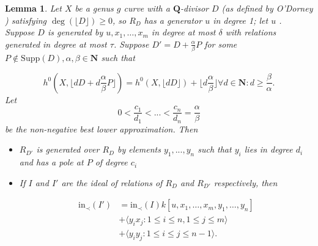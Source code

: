 \documentclass{amsart}
\theoremstyle{plain}
\newtheorem{lem}[thm]{Lemma}
\theoremstyle{definition}
\theoremstyle{remark}
\numberwithin{equation}{section}
\newcommand \Supp{\text{Supp}}
\newcommand \initial{\text{in}}
\begin{document}
\begin{lem}
\label{lem:deg1_sat_ind}
Let $X$ be a genus $g$ curve with a $\mathbf{Q}$-divisor $D$ (as
defined by O'Dorney )
satisfying $\deg(\lfloor{D}\rfloor)\ge 0$, so $R_D$ has a
generator $u$ in degree 1; let $u$ .  Suppose $D$ is generated by $
u, x_1, \ldots, x_m$ in degree at most $\delta$ with relations generated 
in degree at most $\tau $.  Suppose $D' = D + \frac{\alpha}{\beta} P$
for some $P \not \in \Supp(D), \alpha,\beta \in \mathbf{N}$ such
that

\begin{equation}
\label{eqn:deg1_sat_ind_dim}
	h^0(X, \lfloor{dD + d\frac{\alpha}{\beta} P \rfloor}) = h^0(X,\lfloor dD
	\rfloor) + \lfloor d\frac{\alpha} {\beta} \rfloor \forall d \in \mathbf{
	N} : d \ge \frac{\beta}{\alpha}.
\end{equation}
Let 
\[
	0<\frac{c_1}{d_1}<...<\frac{c_n}{d_n}=\frac{\alpha}{\beta}
\]
be the non-negative best lower approximation.
Then 
\begin{itemize}
\item $R_{D'}$ is generated over $R_D$ by elements $y_1,...,y_n$ such that $y_i$ lies in  
degree $d_i$ and has a pole at $P$ of degree $c_i$
\item If $I$ and $I'$ are the ideal of relations of $R_D$ and $R_{D'}$ respectively, then 

\begin{align*}
	\initial_\prec(I') &= \initial_\prec(I) k[u, x_1, \ldots, x_m, y_1, \ldots, y_n] \\
										 &+ \langle y_i x_j: 1 \le i \le n, 1 \le j \le m \rangle \\
										 &+ \langle y_i y_j: 1 \le i \le j \le n-1 \rangle.
\end{align*}

\end{itemize}
\end{lem}
\end{document}
